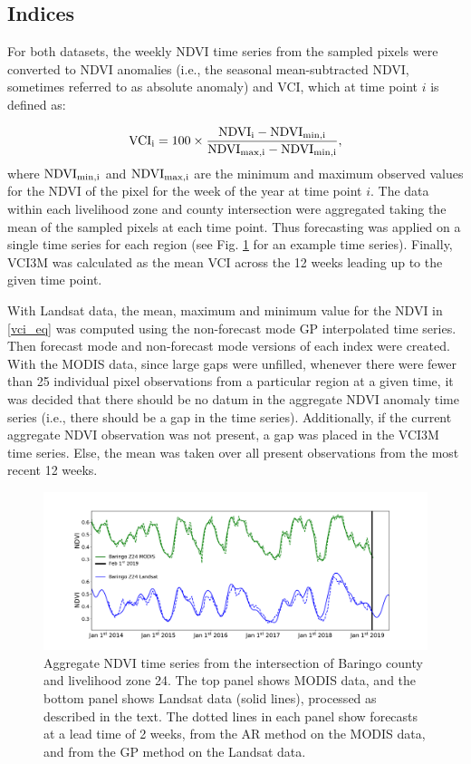 \documentclass[review]{elsarticle}
\begin{document}
\subsection{Indices}
For both datasets, the weekly NDVI time series from the sampled pixels were converted to NDVI anomalies (i.e., the seasonal mean-subtracted NDVI, sometimes referred to as absolute anomaly) and VCI, which at time point $i$ is defined as:

\begin{equation}
\rm{VCI}_i = 100 \times \frac{\rm{NDVI}_i - \rm{NDVI}_{min,i}}{ \rm{NDVI}_{max,i} - \rm{NDVI}_{min,i}},
\label{vci_eq}
\end{equation}
%
where $\rm{NDVI}_{min,i}$ and $\rm{NDVI}_{max,i}$ are the minimum and maximum observed values for the NDVI of the pixel for the week of the year at time point $i$. The data within each livelihood zone and county intersection were aggregated taking the mean of the sampled pixels at each time point. Thus forecasting was applied on a single time series for each region (see Fig. \ref{fig:ndvi_lk} for an example time series). Finally, VCI3M was calculated as the mean VCI across the 12 weeks leading up to the given time point. 

With Landsat data, the mean, maximum and minimum value for the NDVI in \eqref{vci_eq} was computed using the non-forecast mode GP interpolated time series. Then forecast mode and non-forecast mode versions of each index were created. With the MODIS data, since large gaps were unfilled, whenever there were fewer than 25 individual pixel observations from a particular region at a given time, it was decided that there should be no datum in the aggregate NDVI anomaly time series (i.e., there should be a gap in the time series). Additionally, if the current aggregate NDVI observation was not present, a gap was placed in the VCI3M time series. Else, the mean was taken over all present observations from the most recent 12 weeks.

\begin{figure}
	\centering
	\includegraphics[trim = 50mm 0mm 0mm 0mm,width=13.5 cm]{figures/NDVI2.pdf} 
	\caption{Aggregate NDVI time series from the intersection of Baringo county and livelihood zone 24. The top panel shows MODIS data, and the bottom panel shows Landsat data (solid lines), processed as described in the text. The dotted lines in each panel show forecasts at a lead time of 2 weeks, from the AR method on the MODIS data, and from the GP method on the Landsat data.} \label{fig:ndvi_lk}
\end{figure}
\end{document}
